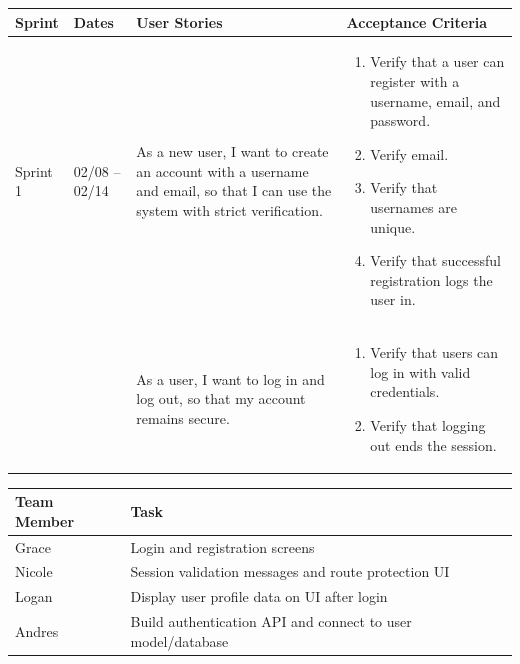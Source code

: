 \documentclass[12pt]{article}
\begin{document}
\noindent
\begin{tabular}{|L{1.2cm}|L{1.8cm}|L{5.2cm}|L{6.3cm}|}
\hline
\textbf{Sprint} & \textbf{Dates} & \textbf{User Stories} & \textbf{Acceptance Criteria} \\
\hline
Sprint 1 & 02/08 -- 02/14 &
As a new user, I want to create an account with a username and email, so that I can use the system with strict verification. &
\begin{enumerate}
    \item Verify that a user can register with a username, email, and password.
    \item Verify email.
    \item Verify that usernames are unique.
    \item Verify that successful registration logs the user in.
\end{enumerate} \\
& &
As a user, I want to log in and log out, so that my account remains secure. &
\begin{enumerate}
    \item Verify that users can log in with valid credentials.
    \item Verify that logging out ends the session.

\end{enumerate} \\
\hline
\end{tabular}

\vspace{0.5em}

\noindent
\begin{tabular}{|L{2.5cm}|L{12.5cm}|}
\hline
\textbf{Team Member} & \textbf{Task} \\
\hline
Grace & Login and registration screens \\
\hline
Nicole & Session validation messages and route protection UI \\
\hline
Logan & Display user profile data on UI after login \\
\hline
Andres & Build authentication API and connect to user model/database \\
\hline
\end{tabular}

\vspace{2em}


\vspace{0.5em}
\end{document}
